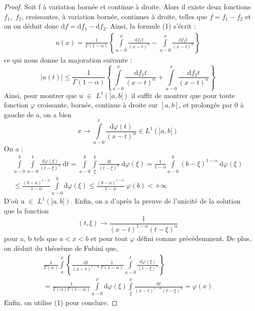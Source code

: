 \documentclass[french]{article}
\begin{document}
\begin{proof}
  Soit f à variation bornée et continue à droite. Alors il existe deux fonctions
  $f_{1}$,\ $f_{2}$, croissantes, à variation bornée, continues à droite, telles que
  $f=f_{1}-f_{2}$ et on on déduit donc
  $\mathrm{d}f=\mathrm{d}f_{1}-\mathrm{d}f_{2}$. Ainsi, la formule (1) s'écrit :
  \begin{align*}
    u(x)=\frac{1}{\Gamma(1-\alpha)} \left\{ \int\limits_{a-0}^{x}\frac{\mathrm{d}f_{1}{t}}{(x-t)^\alpha}-\int\limits_{a-0}^{x}\frac{\mathrm{d}f_{2}{t}}{(x-t)^\alpha} \right\}
  \end{align*}
  ce qui nous donne la majoration suivante :
  \begin{equation*}
    \lvert u(t) \rvert\leq\frac{1}{\Gamma(1-\alpha)} \left\{ \int\limits_{a-0}^{x}\frac{\mathrm{d}f_{1}{t}}{(x-t)^\alpha}+\int\limits_{a-0}^{x}\frac{\mathrm{d}f_{2}{t}}{(x-t)^\alpha} \right\}
  \end{equation*}
  Ainsi, pour montrer que u $\in$ $L^1(]a,b[)$ il suffit de montrer que pour
  toute fonction $\varphi$ croissante, bornée, continue à droite sur $[a,b]$,
  et prolongée par 0 à gauche de a, on a bien
  \begin{equation*}
    x \to \int\limits_{a-0}^{x}\frac{\mathrm{d}\varphi(t)}{(x-t)^\alpha} \in L^1(]a,b[)
  \end{equation*}
  On a :
  \begin{multline}
    \int\limits_{a-0}^{b}\int\limits_{a-0}^{t}\frac{\mathrm{d}\varphi(\xi)}{(t-\xi)^\alpha}\
    \mathrm{d}t=\int\limits_{a-0}^{b}\int\limits_{\xi}^{b}\frac{\mathrm{d}t}{(t-\xi)^\alpha}\
    \mathrm{d}\varphi(\xi)=\frac{1}{1-\alpha}\int\limits_{a-0}^{b}(b-\xi)^{1-\alpha}\
    \mathrm{d}\varphi(\xi)\\
    \leq\frac{(b-a)^{1-\alpha}}{1-\alpha}\int\limits_{a-0}^{b}\mathrm{d}\varphi(\xi)\leq\frac{(b-a)^{1-\alpha}}{1-\alpha}\
    \varphi(b)<+\infty
  \end{multline}
  D'où u $\in$ $L^1(]a,b[)$.
  Enfin, on a d'après la preuve de l'unicité de la solution que la fonction
  \begin{equation*}
    (t,\xi)\to\frac{1}{(x-t)^{1-\alpha}(t-\xi)^{\alpha}}
  \end{equation*}
  pour a, b tels que $a<x<b$ et pour tout $\varphi$ défini comme précédemment.
  De plus, on déduit du théorème de Fubini que,
  \begin{multline}
    \frac{1}{\Gamma(\alpha)}\int\limits_{a}^{x} \left\{
      \frac{\mathrm{d}t}{(x-t)^{1-\alpha}} \frac{1}{\Gamma(1-\alpha)}
      \int\limits_{a-0}^{t}\frac{\mathrm{d}\varphi(\xi)}{(t-\xi)^\alpha} \right\}\\
    =\frac{1}{\Gamma(\alpha)\Gamma(1-\alpha)}\int\limits_{a-0}^{x}\mathrm{d}\varphi(\xi)\int\limits_{\xi}^{x}\frac{\mathrm{d}t}{(x-t)^{1-\alpha}(t-\xi)^{\alpha}}=\varphi(x)
  \end{multline}
  Enfin, on utilise (1) pour conclure.
\end{proof}

\end{document}
